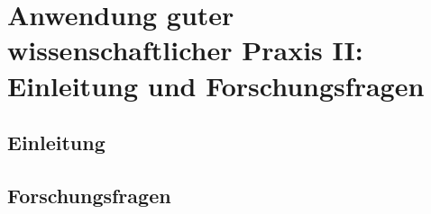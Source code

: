 \section{Anwendung guter wissenschaftlicher Praxis II: Einleitung und Forschungsfragen}

\subsection{Einleitung}
\lipsum[1-2]

\subsection{Forschungsfragen}
\lipsum[1-2]